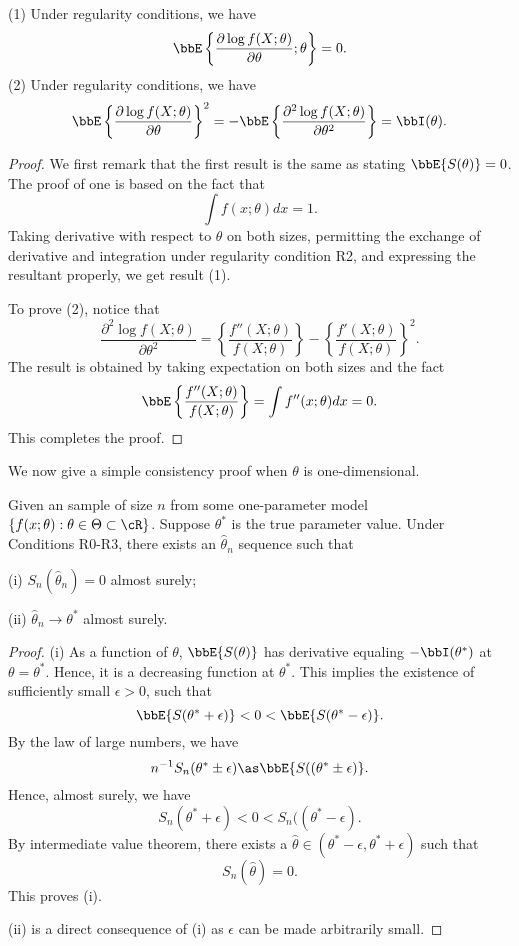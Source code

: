 \begin{lemma}
(1) Under regularity conditions, we have
\[
\bbE \left \{ \frac{\partial \log f(X; \theta)}{\partial \theta}; \theta \right \} = 0.
\]
(2)  Under regularity conditions, we have
\[
\bbE \left \{ \frac{\partial \log f(X; \theta)}{\partial \theta} \right \}^2
=
-
\bbE \left \{ \frac{\partial^2 \log f(X; \theta)}{\partial \theta^2} \right \}
=
\bbI(\theta).
\]
\end{lemma}

\begin{proof}
We first remark that the first result is the same as stating $\bbE\{S(\theta)\} = 0$.
The proof of one is based on the fact that
\[
\int f(x; \theta) dx = 1.
\]
Taking derivative with respect to $\theta$ on both sizes, permitting the
exchange of derivative and integration under regularity condition R2,
and expressing the resultant properly, we get result (1).

To prove (2), notice that
\[
\frac{\partial^2 \log f(X; \theta)}{\partial \theta^2}
=
\left\{ \frac{ f''(X; \theta)}{f(X; \theta)} \right \}
- 
\left\{ \frac{ f'(X; \theta)}{f(X; \theta)} \right \}^2.
\]
The result is obtained by taking expectation on both sizes
and the fact
\[
\bbE\left\{ \frac{ f''(X; \theta)}{f(X; \theta)} \right \}
=
\int f''(x; \theta) dx  = 0.
\]
This completes the proof.
\end{proof}
 
We now give a simple consistency proof when $\theta$ is one-dimensional.
 
\begin{theorem}
Given an \iid sample of size $n$ from some one-parameter
model $\{f(x; \theta): \theta \in \Theta \subset \cR\}$.
Suppose $\theta^*$ is the true parameter value.
Under Conditions R0-R3, there exists an $\hat \theta_n$ sequence
such that

(i) $S_n(\hat \theta_n) =0$ almost surely; 

(ii) $\hat \theta_n \to \theta^*$ almost surely.
\end{theorem}

\begin{proof}
(i) 
As a function of $\theta$, $\bbE \{ S(\theta)\}$ has derivative
equaling $-\bbI(\theta^*)$ at $\theta = \theta^*$. Hence, it is a
decreasing function at $\theta^*$. This implies the existence of
sufficiently small $\epsilon > 0$, such that
\[
 \bbE \{ S(\theta^* + \epsilon)\} < 0 <  \bbE \{ S(\theta^* - \epsilon)\}.
\]
By the law of large numbers, we have
\[
n^{-1} S_n(\theta^* \pm \epsilon)
\as \bbE \{ S((\theta^* \pm \epsilon)\}.
\]
Hence, almost surely, we have
\[
 S_n(\theta^* + \epsilon) < 0 < S_n((\theta^* - \epsilon).
\]
By intermediate value theorem, there exists a 
$\hat \theta \in (\theta^*-\epsilon, \theta^*+\epsilon)$
such that
\[
S_n(\hat \theta) = 0.
\]
This proves (i).

(ii) is a direct consequence of (i) as $\epsilon$ can be
made arbitrarily small.
\end{proof}


